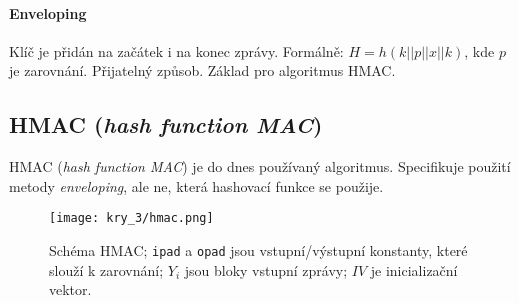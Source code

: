 \paragraph*{Enveloping} Klíč je přidán na začátek i na konec zprávy. Formálně: $H = h(k || p || x || k)$, kde $p$ je zarovnání. Přijatelný způsob. Základ pro algoritmus HMAC.

\subsection{HMAC (\textit{hash function MAC})}

HMAC (\textit{hash function MAC}) je do dnes používaný algoritmus. Specifikuje použití metody \textit{enveloping}, ale ne, která hashovací funkce se použije.

\begin{figure}[H]
    \centering
    \texttt{[image: kry\_3/hmac.png]}
    \caption{Schéma HMAC; \texttt{ipad} a \texttt{opad} jsou vstupní/výstupní konstanty, které slouží k zarovnání; $Y_i$ jsou bloky vstupní zprávy; $IV$ je inicializační vektor.}
\end{figure}
